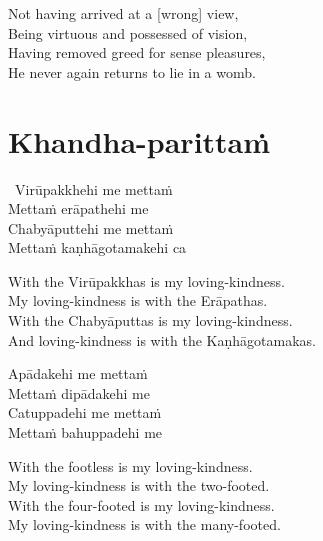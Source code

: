 \begin{english-verses}
  Not having arrived at a [wrong] view,\\
  Being virtuous and possessed of vision,\\
  Having removed greed for sense pleasures,\\
  He never again returns to lie in a womb.
\end{english-verses}

\suttaRef{[Snp 1.8]}

\section{Khandha-parittaṁ}
\label{khandha-parittam}

\begin{pali-hangtogether}
  \anglebracketleft\ \hspace{-0.5mm}Virūpakkhehi me mettaṁ \hspace{-0.5mm}\anglebracketright\ \\
  Mettaṁ erāpathehi me\\
  Chabyāputtehi me mettaṁ\\
  Mettaṁ kaṇhāgotamakehi ca
\end{pali-hangtogether}

\begin{english-verses}
  With the Virūpakkhas is my loving-kindness.\\
  My loving-kindness is with the Erāpathas.\\
  With the Chabyāputtas is my loving-kindness.\\
  And loving-kindness is with the Kaṇhāgotamakas.
\end{english-verses}

\begin{pali-hang-continued}
  Apādakehi me mettaṁ\\
  Mettaṁ dipādakehi me\\
  Catuppadehi me mettaṁ\\
  Mettaṁ bahuppadehi me
\end{pali-hang-continued}

\begin{english-verses}
  With the footless is my loving-kindness.\\
  My loving-kindness is with the two-footed.\\
  With the four-footed is my loving-kindness.\\
  My loving-kindness is with the many-footed.
\end{english-verses}

